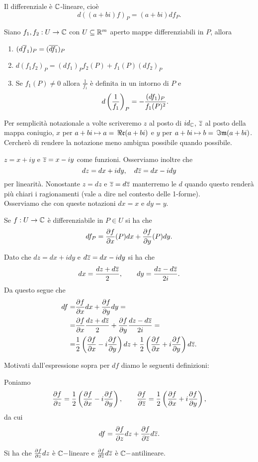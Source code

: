\begin{multicols*}{2}
\begin{proposition}
Il differenziale \`e $\C$-lineare, cio\`e
\[d((a+bi)f)_P=(a+bi)df_P.\]
\end{proposition}


\begin{proposition}
Siano $f_1,f_2:U\to\C$ con $U\subseteq\R^m$ aperto mappe differenziabili in $P$, allora
\begin{enumerate}[noitemsep]
\item $(d\ol f_1)_P=(\ol{df_1})_P$
\item $d(f_1f_2)_P=(df_1)_Pf_2(P)+f_1(P)(df_2)_P$
\item Se $f_1(P)\neq 0$ allora $\frac 1{f_1}$ \`e definita in un intorno di $P$ e
\[d\pa{\frac1{f_1}}_P=-\frac{(df_1)_P}{f_1(P)^2}.\]
\end{enumerate}
\end{proposition}

\begin{notation}
Per semplicit\`a notazionale a volte scriveremo $z$ al posto di $id_\C$, $\ol z$ al posto della mappa coniugio, $x$ per $a+bi\mapsto a=\Real(a+bi)$ e $y$ per $a+bi\mapsto b=\Imag(a+bi)$. Cercher\`o di rendere la notazione meno ambigua possibile quando possibile.
\end{notation}

\begin{remark}
$z=x+iy$ e $\ol z=x-iy$ come funzioni. Osserviamo inoltre che
\[dz=dx+idy,\quad d\ol z=dx-idy\]
per linearit\`a. Nonostante $z=dz$ e $\ol z=d\ol z$ manterremo le $d$ quando questo render\`a pi\`u chiari i ragionamenti (vale a dire nel contesto delle 1-forme).\\
Osserviamo che con queste notazioni $dx=x$ e $dy=y$.
\end{remark}

\begin{remark}
Se $f:U\to\C$ \`e differenziabile in $P\in U$ si ha che
\[df_P=\pdp[x]f(P)dx+\pdp[y]f(P)dy.\]
\end{remark}
\begin{remark}
Dato che $dz=dx+idy$ e $d\ol z=dx-idy$ si ha che
\[dx=\frac{dz+d\ol z}2,\qquad dy=\frac{dz-d\ol z}{2i}.\]
Da questo segue che
\begin{align*}
df=&\pdp[x]fdx+\pdp[y]fdy =\\
=&\pdp[x]f\frac{dz+d\ol z}2+\pdp[y]f\frac{dz-d\ol z}{2i}=\\
=&\frac12\pa{\pdp[x]f-i\pdp[y]f}dz+\frac12\pa{\pdp[x]f+i\pdp[y]f}d\ol z.
\end{align*}
\end{remark}
\noindent
Motivati dall'espressione sopra per $df$ diamo le seguenti definizioni:
\begin{notation}
Poniamo
\[\pdp[z]f=\frac12\pa{\pdp[x]f-i\pdp[y]f},\qquad \pdp[\ol z]f=\frac12\pa{\pdp[x]f+i\pdp[y]f},\]
da cui
\[df=\pdp[z]fdz+\pdp[\ol z]fd\ol z.\]
\end{notation}
\begin{remark}
Si ha che $\pdp[z]fdz$ \`e $\C-$lineare e $\pdp[\ol z]fd\ol z$ \`e $\C-$antilineare.
\end{remark}


\end{multicols*}
